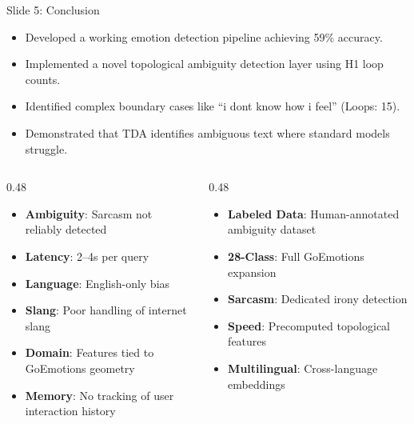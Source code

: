 \documentclass[aspectratio=169]{beamer}
\begin{document}
\begin{frame}[t,label=slide5]{Slide 5: Conclusion}
\vspace*{-0.2cm}
\begin{tcolorbox}[mybox,title=Summary of Achievements]
\scriptsize
\begin{itemize}
    \item Developed a working emotion detection pipeline achieving 59\% accuracy.
    \item Implemented a novel topological ambiguity detection layer using H1 loop counts.
    \item Identified complex boundary cases like ``i dont know how i feel'' (Loops: 15).
    \item Demonstrated that TDA identifies ambiguous text where standard models struggle.
\end{itemize}
\end{tcolorbox}

\vspace*{-0.3cm}

\begin{columns}[T]
\begin{column}{0.48\textwidth}
\begin{tcolorbox}[mybox,title=Limitations,height=4.4cm]
\scriptsize
\begin{itemize}
    \item \textbf{Ambiguity}: Sarcasm not reliably detected  
    \item \textbf{Latency}: 2--4s per query  
    \item \textbf{Language}: English-only bias  
    \item \textbf{Slang}: Poor handling of internet slang
    \item \textbf{Domain}: Features tied to GoEmotions geometry
    \item \textbf{Memory}: No tracking of user interaction history
\end{itemize}
\end{tcolorbox}
\end{column}

\begin{column}{0.48\textwidth}
\begin{tcolorbox}[tdabox,title=Future Work,height=4.4cm]
\scriptsize
\begin{itemize}
    \item \textbf{Labeled Data}: Human-annotated ambiguity dataset  
    \item \textbf{28-Class}: Full GoEmotions expansion  
    \item \textbf{Sarcasm}: Dedicated irony detection  
    \item \textbf{Speed}: Precomputed topological features  
    \item \textbf{Multilingual}: Cross-language embeddings
\end{itemize}
\end{tcolorbox}
\end{column}
\end{columns}
\end{frame}
\end{document}
